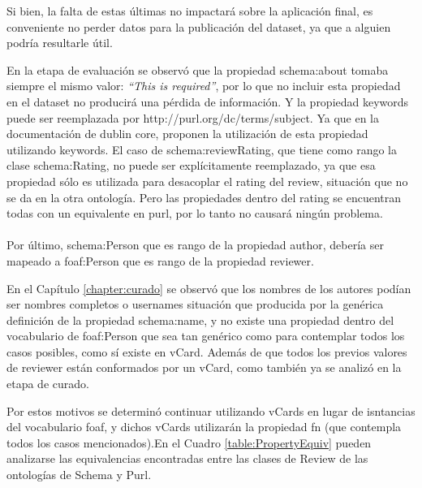 Si bien, la falta de estas últimas no impactará sobre la aplicación final, es conveniente no perder datos para la publicación del dataset, ya que 
a alguien podría resultarle útil. 

En la etapa de evaluación se observó que la propiedad schema:about tomaba siempre el mismo valor: \textit{``This is required''}, 
por lo que no incluir esta propiedad en el dataset no producirá una pérdida de información.
Y la propiedad keywords puede ser reemplazada por http://purl.org/dc/terms/subject. Ya que en la documentación de dublin core, proponen la utilización de esta propiedad 
utilizando keywords.
El caso de schema:reviewRating, que tiene como rango la clase schema:Rating, no puede ser explícitamente reemplazado, ya que esa propiedad 
sólo es utilizada para desacoplar el rating del review, situación que no se da en la otra ontología. Pero las propiedades dentro del rating se encuentran todas 
con un equivalente en purl, por lo tanto no causará ningún problema.
\\\\
Por último, schema:Person que es rango de la propiedad author, debería ser mapeado a foaf:Person que es rango de la propiedad reviewer. 

En el Capítulo \ref{chapter:curado} se observó que los nombres de los autores podían ser nombres completos o usernames situación que producida por la genérica definición de la propiedad schema:name, 
y no existe una propiedad dentro del vocabulario de foaf:Person que sea tan genérico como para contemplar todos los casos posibles, como sí existe en vCard.
Además de que todos los previos valores de reviewer están conformados por un vCard, como también ya se analizó en la etapa de curado.

Por estos motivos se determinó continuar utilizando vCards en lugar de isntancias del vocabulario foaf, y dichos vCards utilizarán la propiedad
fn (que contempla todos los casos mencionados).En el Cuadro \ref{table:PropertyEquiv} pueden analizarse las equivalencias encontradas entre 
las clases de Review de las ontologías de Schema y Purl.

